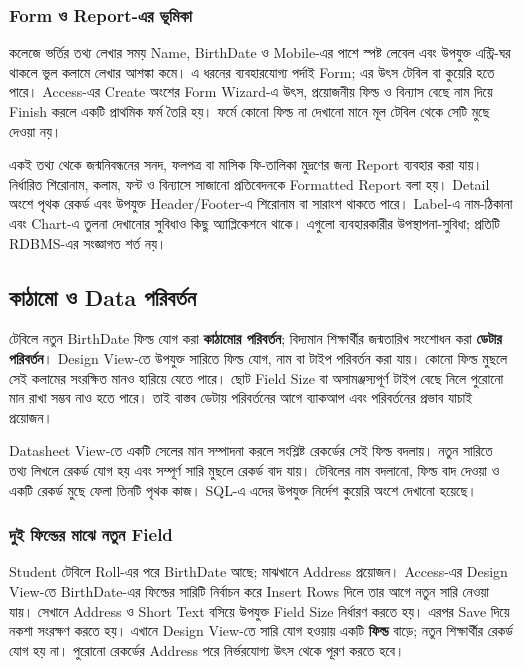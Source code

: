 \subsubsection{Form ও Report-এর ভূমিকা}
কলেজে ভর্তির তথ্য লেখার সময় Name, BirthDate ও Mobile-এর পাশে স্পষ্ট লেবেল এবং উপযুক্ত এন্ট্রি-ঘর থাকলে ভুল কলামে লেখার আশঙ্কা কমে। এ ধরনের ব্যবহারযোগ্য পর্দাই Form; এর উৎস টেবিল বা কুয়েরি হতে পারে। Access-এর Create অংশের Form Wizard-এ উৎস, প্রয়োজনীয় ফিল্ড ও বিন্যাস বেছে নাম দিয়ে Finish করলে একটি প্রাথমিক ফর্ম তৈরি হয়। ফর্মে কোনো ফিল্ড না দেখানো মানে মূল টেবিল থেকে সেটি মুছে দেওয়া নয়।

একই তথ্য থেকে জন্মনিবন্ধনের সনদ, ফলপত্র বা মাসিক ফি-তালিকা মুদ্রণের জন্য Report ব্যবহার করা যায়। নির্ধারিত শিরোনাম, কলাম, ফন্ট ও বিন্যাসে সাজানো প্রতিবেদনকে Formatted Report বলা হয়। Detail অংশে পৃথক রেকর্ড এবং উপযুক্ত Header/Footer-এ শিরোনাম বা সারাংশ থাকতে পারে। Label-এ নাম-ঠিকানা এবং Chart-এ তুলনা দেখানোর সুবিধাও কিছু অ্যাপ্লিকেশনে থাকে। এগুলো ব্যবহারকারীর উপস্থাপনা-সুবিধা; প্রতিটি RDBMS-এর সংজ্ঞাগত শর্ত নয়।

\subsection{কাঠামো ও Data পরিবর্তন}
টেবিলে নতুন BirthDate ফিল্ড যোগ করা \textbf{কাঠামোর পরিবর্তন}; বিদ্যমান শিক্ষার্থীর জন্মতারিখ সংশোধন করা \textbf{ডেটার পরিবর্তন}। Design View-তে উপযুক্ত সারিতে ফিল্ড যোগ, নাম বা টাইপ পরিবর্তন করা যায়। কোনো ফিল্ড মুছলে সেই কলামের সংরক্ষিত মানও হারিয়ে যেতে পারে। ছোট Field Size বা অসামঞ্জস্যপূর্ণ টাইপ বেছে নিলে পুরোনো মান রাখা সম্ভব নাও হতে পারে। তাই বাস্তব ডেটায় পরিবর্তনের আগে ব্যাকআপ এবং পরিবর্তনের প্রভাব যাচাই প্রয়োজন।

Datasheet View-তে একটি সেলের মান সম্পাদনা করলে সংশ্লিষ্ট রেকর্ডের সেই ফিল্ড বদলায়। নতুন সারিতে তথ্য লিখলে রেকর্ড যোগ হয় এবং সম্পূর্ণ সারি মুছলে রেকর্ড বাদ যায়। টেবিলের নাম বদলানো, ফিল্ড বাদ দেওয়া ও একটি রেকর্ড মুছে ফেলা তিনটি পৃথক কাজ। SQL-এ এদের উপযুক্ত নির্দেশ কুয়েরি অংশে দেখানো হয়েছে।

\subsubsection{দুই ফিল্ডের মাঝে নতুন Field}
Student টেবিলে Roll-এর পরে BirthDate আছে; মাঝখানে Address প্রয়োজন। Access-এর Design View-তে
BirthDate-এর ফিল্ডের সারিটি নির্বাচন করে Insert Rows দিলে তার আগে নতুন সারি নেওয়া যায়। সেখানে
Address ও Short Text বসিয়ে উপযুক্ত Field Size নির্ধারণ করতে হয়। এরপর Save দিয়ে নকশা সংরক্ষণ করতে হয়।
এখানে Design View-তে সারি যোগ হওয়ায় একটি \textbf{ফিল্ড} বাড়ে; নতুন শিক্ষার্থীর রেকর্ড যোগ হয় না।
পুরোনো রেকর্ডের Address পরে নির্ভরযোগ্য উৎস থেকে পূরণ করতে হবে।

